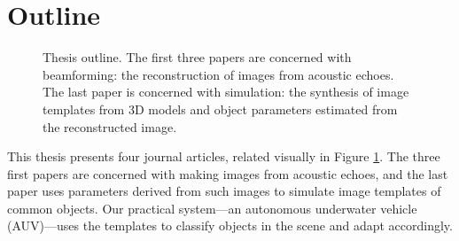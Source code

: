 %
%
%


\section{Outline}

\begin{figure}[!thb]
\caption{Thesis outline. The first three papers are concerned with beamforming: the reconstruction of images from acoustic echoes. The last paper is concerned with simulation: the synthesis of image templates from 3D models and object parameters estimated from the reconstructed image. %
}\label{fig_outline_simple}
\end{figure}

This thesis presents four journal articles, related visually in Figure \ref{fig_outline_simple}. The three first papers are concerned with making images from acoustic echoes, and the last paper uses parameters derived from such images to simulate image templates of common objects. Our practical system---an autonomous underwater vehicle (AUV)---uses the templates to classify objects in the scene and adapt accordingly. 

